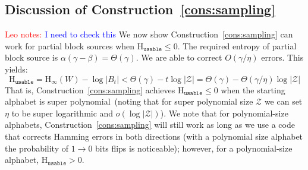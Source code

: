 \documentclass[11pt]{article}
\newcommand{\thref}[1]{\mbox{Theorem~\ref{#1}}}
\newcommand{\consref}[1]{\mbox{Construction~\ref{#1}}}
\newcommand{\class}[1]{{\ensuremath{\mathsf{#1}}}}
\newcommand{\gen}{\ensuremath{\class{Gen}}\xspace}
\newcommand{\rep}{\ensuremath{\class{Rep}}\xspace}
\newcommand{\dis}{\ensuremath{\mathsf{dis}}}
\newcommand{\ngl}{\ensuremath{\mathtt{ngl}}\xspace}
\newcommand{\Hoo}{\mathrm{H}_\infty}
\newcommand{\Huse}{\mathrm{H}_{\mathtt{usable}}}
\newtheorem{corollary}[theorem]{Corollary}
\newcommand{\authnote}[2]{{\textcolor{red}{\textsf{#1 notes: }\textcolor{blue}{ #2}}\marginpar{\textcolor{red}{\textbf{!!!!!}}}}}
\newcommand{\authnote}[2]{}
\newcommand{\lnote}[1]{{\authnote{Leo}{#1}}}
\begin{document}

\subsection{Discussion of \consref{cons:sampling}}
\lnote{I need to check this}
We now show \consref{cons:sampling} can work for partial block sources when $\Huse\le 0$.  The required entropy of partial block source is $\alpha (\gamma-\beta ) = \Theta(\gamma)$.  We are able to correct $O(\gamma/\eta)$ errors.
This yields:
\[
\Huse = \Hoo(W) -\log |B_t| < \Theta(\gamma)- t \log |\mathcal{Z}|= \Theta(\gamma) - \Theta(\gamma/\eta) \log |\mathcal{Z}|
\]
That is, \consref{cons:sampling} achieves $\Huse\le 0$ when the starting alphabet is super polynomial~(noting that for super polynomial size $\mathcal{Z}$ we can set $\eta$ to be super logarithmic and $o(\log |\mathcal{Z}|)$).  We note that for polynomial-size alphabets, \consref{cons:sampling} will still work as long as we use a code that corrects Hamming errors in both directions (with a polynomial size alphabet the probability of $1\rightarrow 0$ bits flips is noticeable); however, for a polynomial-size alphabet, $\Huse>0$.



\appendix
\end{document}
